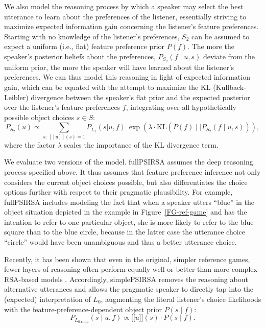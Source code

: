 \documentclass[10pt,a4paper]{article}
\newcommand{\sem}[1]{\mbox{$[\![$#1$]\!]$}}
\newcommand{\gcs}[1]{\textcolor{blue}{[gcs: #1]}}
\begin{document}
We also model the reasoning process by which a speaker may select the best utterance to learn about the preferences of the listener, essentially striving to maximize expected information gain concerning the listener's feature preferences.
Starting with no knowledge of the listener's preferences, $S_2$ can be assumed to expect a uniform (i.e., flat) feature preference prior $P(f)$.
The more the speaker's posterior beliefs about the preferences, $P_{S_{2}}(f\mid u,s)$ deviate from the uniform prior, the more the speaker will have learned about the listener's preferences. 
We can thus model this reasoning in light of expected information gain, which can be equated with the attempt to maximize the KL (Kullback-Leibler) divergence between the speaker's flat prior and the expected posterior over the listener's feature preferences $f$, integrating over all hypothetically possible object choices $s \in S$: %
\begin{equation}
P_{S_2}(u) \propto \sum_{s:\  [\![u]\!](s)=1} P_{L_1}(s|u,f)\ \exp(\lambda \cdot \textrm{KL}(P(f)\mid\mid P_{S_{2}}(f\mid u,s))),
\label{eq:kldivlambda}
\end{equation}
where the factor $\lambda$ scales the importance of the KL divergence term. 


We evaluate two versions of the model. 
fullPSIRSA assumes the deep reasoning process specified above. 
It thus assumes that feature preference inference not only considers the current object choices possible, but also differentiates the choice options further with respect to their pragmatic plausibility. 
For example, fullPSIRSA includes modeling the fact that when a speaker utters ``blue'' in the object situation depicted in the example in Figure~\ref{FG-ref-game} and has the intention to refer to one particular object, she is more likely to refer to the blue square than to the blue circle, because in the latter case the utterance choice ``circle'' would have been unambiguous and thus a better utterance choice.


Recently, it has been shown that even in the original, simpler reference games, fewer layers of reasoning often perform equally well or better than more complex RSA-based models \cite{sikos2019}.
Accordingly, simplePSIRSA removes the reasoning about alternative utterances and allows the pragmatic speaker to directly tap into the (expected) interpretation of $L_0$, augmenting the literal listener's choice likelihoods with the feature-preference-dependent object prior $P(s\mid f)$:
\begin{equation}
P_{L_{0\textrm{-simp}}}(s\mid u,f) \propto \sem{$u$}(s) \cdot P(s\mid f).
\end{equation}
\end{document}
